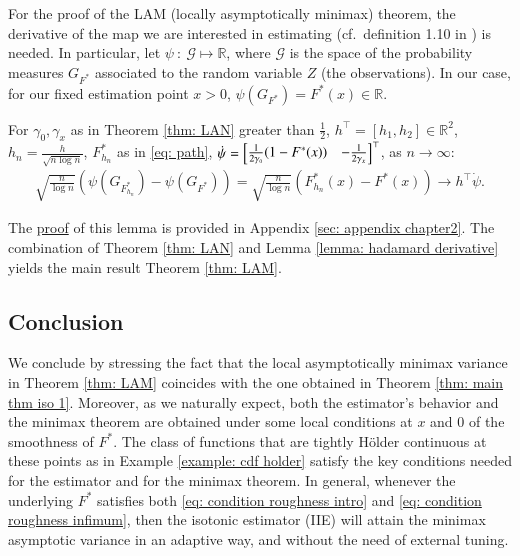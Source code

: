 For the proof of the LAM (locally asymptotically minimax) theorem, the derivative of the map we are interested in estimating (cf.\ definition 1.10 in \cite{13}) is needed. In particular, let $\psi \: : \: \mathcal{G} \mapsto \mathbb{R}$, where $\mathcal{G}$ is the space of the probability measures $G_{F^*}$ associated to the random variable $Z$ (the observations). In our case, for our fixed estimation point $x>0$, $\psi(G_{F^*}) = F^*(x) \in \mathbb{R}$. 
\begin{lemma}\label{lemma: hadamard derivative}
    For $\gamma_0, \gamma_x$ as in Theorem \ref{thm: LAN} greater than $\frac{1}{2}$, $h^{\top} = [h_1,h_2] \in \mathbb{R}^2$, $h_n = \frac{h}{\sqrt{n\log{n}}}$, $F^*_{h_n}$ as in \eqref{eq: path},  $\dot{\psi} = \begin{bmatrix} \frac{1}{2\gamma_{\scaleto{0}{2.5pt}}} (1-F^*(x)) & - \frac{1}{2\gamma_{\scaleto{x}{2.2pt}}} \end{bmatrix}^{\top}$, as $n \rightarrow \infty$:
    \begin{align*}
        \sqrt{\frac{n}{\log{n}}} \left( \psi(G_{F^*_{h_n}}) - \psi(G_{F^*}) \right) = \sqrt{\frac{n}{\log{n}}} \left( F^*_{h_n}(x) - F^*(x) \right) \rightarrow h^{\top} \dot{\psi}.
    \end{align*}
\end{lemma}
The \hyperlink{proof of lemma 10}{proof} of this lemma is provided in Appendix \ref{sec: appendix chapter2}. The combination of Theorem \ref{thm: LAN} and Lemma \ref{lemma: hadamard derivative} yields the main result Theorem \ref{thm: LAM}.

\subsection{Conclusion}

We conclude by stressing the fact that the local asymptotically minimax variance in Theorem \ref{thm: LAM} coincides with the one obtained in Theorem \ref{thm: main thm iso 1}. Moreover, as we naturally expect, both the estimator's behavior and the minimax theorem are obtained under some local conditions at $x$ and $0$ of the smoothness of $F^*$. The class of functions that are tightly Hölder continuous at these points as in Example \ref{example: cdf holder} satisfy the key conditions needed for the estimator and for the minimax theorem. In general, whenever the underlying $F^*$ satisfies both \eqref{eq: condition roughness intro} and \eqref{eq: condition roughness infimum}, then the isotonic estimator (IIE) will attain the minimax asymptotic variance in an adaptive way, and without the need of external tuning. 

